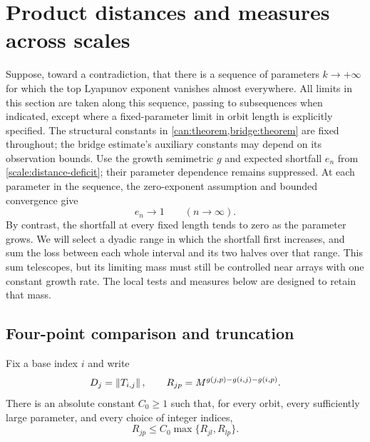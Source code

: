 \section{Product distances and measures across scales}
\label{sec:scales}

Suppose, toward a contradiction, that there is a sequence of parameters
$k\to+\infty$ for which the top Lyapunov exponent vanishes almost
everywhere. All limits in this section are taken along this sequence,
passing to subsequences when indicated, except where a fixed-parameter
limit in orbit length is explicitly specified. The structural constants
in \cref{can:theorem,bridge:theorem} are fixed throughout; the bridge
estimate's auxiliary constants may depend on its observation bounds.
Use the growth semimetric $g$ and expected shortfall $e_n$ from
\cref{scale:distance-deficit}; their parameter dependence remains
suppressed. At each parameter in the sequence, the zero-exponent
assumption and bounded convergence give
\begin{equation}\label{scale:long-deficit}
e_n\longrightarrow1\qquad(n\to\infty).
\end{equation}
By contrast, the shortfall at every fixed length tends to zero as the
parameter grows. We will select a dyadic range in which the shortfall
first increases, and sum the loss between each whole interval and its
two halves over that range. This sum telescopes, but its limiting mass
must still be controlled near arrays with one constant growth rate.
The local tests and measures below are designed to retain that mass.

\subsection{Four-point comparison and truncation}

\begin{lemma}\label{scale:fourpoint}
Fix a base index $i$ and write
\[
 D_j=\left\lVert T_{i,j}\right\rVert,\qquad
 R_{jp}=M^{g(j,p)-g(i,j)-g(i,p)}.
\]
There is an absolute constant $C_0\ge1$ such that, for every orbit,
every sufficiently large parameter, and every choice of integer indices,
\begin{equation}\label{scale:R-fourpoint}
 R_{jp}\le C_0\max\{R_{jl},R_{lp}\}.
\end{equation}
\end{lemma}

